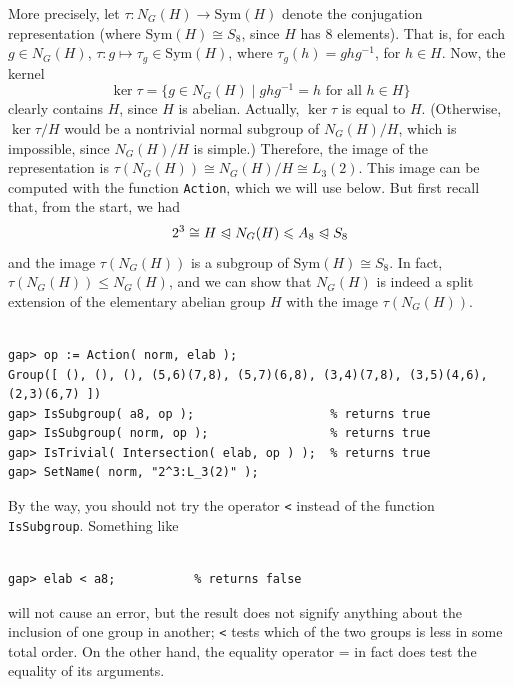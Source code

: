 \documentclass[11pt]{amsart}
\theoremstyle{plain}
\newcommand{\codesize}{\footnotesize}
\newcommand{\<}{\ensuremath{\langle}}
\renewcommand{\>}{\ensuremath{\rangle}}
\newcommand{\Sym}{\ensuremath{\mathrm{Sym}}}
\newcommand{\subnormal}{\ensuremath{\trianglelefteqslant}}
\renewcommand{\leq}{\ensuremath{\leqslant}}
\begin{document}
More precisely, let $\tau : N_G(H) \rightarrow \Sym(H)$ denote the conjugation
representation (where $\Sym(H)\cong S_8$, since $H$ has 8 elements).  
That is, for each $g\in N_G(H)$, $\tau: g \mapsto \tau_g\in \Sym(H)$,
where $\tau_g(h) = gh g^{-1}$, for $h\in H$.  Now, the kernel
\[
\ker \tau = \{ g\in N_G(H) \mid  gh g^{-1} = h \text{ for all } h\in H\}
\]
clearly contains $H$, since $H$ is abelian.  
Actually, $\ker \tau$ is equal to $H$.  (Otherwise, $\ker \tau / H$ would
be a nontrivial normal subgroup of $N_G(H)/H$, which is impossible, since $N_G(H)/H$
is simple.)
Therefore, the image of the representation is $\tau(N_G(H)) \cong N_G(H)/H \cong L_3(2)$.  
This image can be computed with the function {\tt Action}, which we will use below.
But first recall that, from the start, we had 
\[
2^3 \cong H \subnormal N_G(H) \leq A_8 \subnormal S_8
\]
and the image $\tau(N_G(H))$ is a subgroup of $\Sym(H) \cong S_8$.  In fact, $\tau(N_G(H)) \leq
N_G(H)$, and we can show that $N_G(H)$ is indeed a split extension of the elementary
abelian group $H$ with the image $\tau(N_G(H))$. 
{\codesize
\begin{verbatim}

gap> op := Action( norm, elab );
Group([ (), (), (), (5,6)(7,8), (5,7)(6,8), (3,4)(7,8), (3,5)(4,6), (2,3)(6,7) ])
gap> IsSubgroup( a8, op );                   % returns true
gap> IsSubgroup( norm, op );                 % returns true
gap> IsTrivial( Intersection( elab, op ) );  % returns true
gap> SetName( norm, "2^3:L_3(2)" );

\end{verbatim}}
\noindent By the way, you should not try the operator \verb.<. instead of the function {\tt IsSubgroup}. Something like
{\codesize
\begin{verbatim}

gap> elab < a8;           % returns false

\end{verbatim}}
\noindent will not cause an error, but the result does not signify anything about the inclusion of one group in another;
\verb.<. tests which of the two groups is less in some total order. On the other hand, the equality operator = in
fact does test the equality of its arguments.
\end{document}
